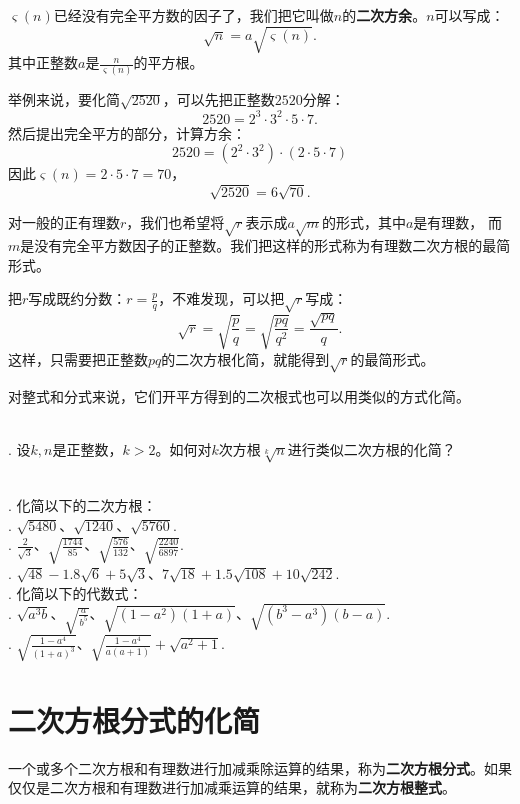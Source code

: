 \documentclass[12pt,UTF8,fontset=none]{ctexbook}
\begin{document}
$\varsigma(n)$已经没有完全平方数的因子了，我们把它叫做$n$的\textbf{二次方余}。$n$可以写成：
$$ \sqrt{n} = a\sqrt{\varsigma(n)}.$$
其中正整数$a$是$\frac{n}{\varsigma(n)}$的平方根。

举例来说，要化简$\sqrt{2520}$，可以先把正整数$2520$分解：
$$ 2520 = 2^3 \cdot 3^2 \cdot 5 \cdot 7.$$
然后提出完全平方的部分，计算方余：
$$ 2520 = \left(2^2 \cdot 3^2 \right) \cdot (2 \cdot 5 \cdot 7)$$
因此$\varsigma(n) = 2 \cdot 5 \cdot 7 = 70$，
$$ \sqrt{2520} = 6 \sqrt{70}.$$

对一般的正有理数$r$，我们也希望将$\sqrt{r}$表示成$a\sqrt{m}$的形式，其中$a$是有理数，
而$m$是没有完全平方数因子的正整数。我们把这样的形式称为有理数二次方根的最简形式。

把$r$写成既约分数：$r = \frac{p}{q}$，不难发现，可以把$\sqrt{r}$写成：
$$ \sqrt{r} = \sqrt{\frac{p}{q}} = \sqrt{\frac{pq}{q^2}} = \frac{\sqrt{pq}}{q}.$$
这样，只需要把正整数$pq$的二次方根化简，就能得到$\sqrt{r}$的最简形式。

对整式和分式来说，它们开平方得到的二次根式也可以用类似的方式化简。

\begin{sk}
    \mbox{} \\
    . 设$k,n$是正整数，$k>2$。如何对$k$次方根$\sqrt[k]{n}$进行类似二次方根的化简？
\end{sk}

\begin{xt}\label{xt:3-0-0}
    \mbox{} \\
    . 化简以下的二次方根：\\
    . $\sqrt{5480}$、$\sqrt{1240}$、$\sqrt{5760}$.\\
    . $\displaystyle\frac{2}{\sqrt{3}}$、$\displaystyle\sqrt{\frac{1744}{85}}$、$\displaystyle\sqrt{\frac{576}{132}}$、$\displaystyle\sqrt{\frac{2240}{6897}}$.\\
    . $\sqrt{48} - 1.8\sqrt{6} + 5\sqrt{3}$、$7\sqrt{18} + 1.5\sqrt{108} + 10\sqrt{242}$.\\
    . 化简以下的代数式：\\
    . $\sqrt{a^3b}$、$\displaystyle\sqrt{\frac{a}{b^5}}$、$\sqrt{(1 - a^2)(1 + a)}$、$\sqrt{(b^3 - a^3)(b - a)}$.\\
    . $\displaystyle\sqrt{\frac{1 - a^4}{(1 + a)^3}}$、$\displaystyle\sqrt{\frac{1 - a^4}{a(a+1)}} + \sqrt{a^2+1}$.
\end{xt}

\section{二次方根分式的化简}
一个或多个二次方根和有理数进行加减乘除运算的结果，称为\textbf{二次方根分式}。如果仅仅是二次方根和有理数进行加减乘运算的结果，就称为\textbf{二次方根整式}。
\end{document}

